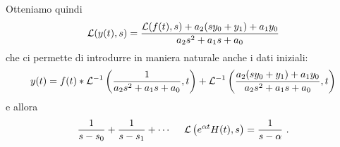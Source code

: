 Otteniamo quindi
\begin{equation*}
\mathcal{L}(y(t), s) = \frac{\mathcal{L}(f(t), s) + a_{2}(sy_{0} + y_{1}) + a_{1} y_{0}}{a_{2} s^{2} + a_{1} s + a_{0}}
\end{equation*}
che ci permette di introdurre in maniera naturale anche i dati iniziali:
\begin{equation*}
y(t) = f(t) *\mathcal{L}^{- 1}\left(\frac{1}{a_{2} s^{2} + a_{1} s + a_{0}}, t\right) + \mathcal{L}^{- 1}\left(\frac{a_{2}(sy_{0} + y_{1}) + a_{1} y_{0}}{a_{2} s^{2} + a_{1} s + a_{0}}, t\right)
\end{equation*}
e allora
\begin{equation*}
\frac{1}{s - s_{0}} + \frac{1}{s - s_{1}} + \cdots \ \ \ \ \mathcal{L}\left(e^{\alpha t} H(t), s\right) = \frac{1}{s - \alpha}\ .
\end{equation*}